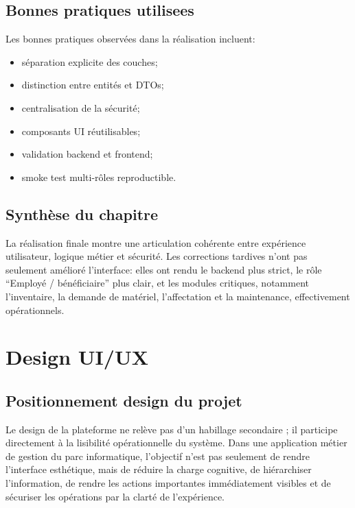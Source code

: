 ﻿\documentclass[12pt,a4paper,oneside]{report}
\begin{document}
\section{Bonnes pratiques utilisees}
Les bonnes pratiques observées dans la réalisation incluent:
\begin{itemize}
  \item séparation explicite des couches;
  \item distinction entre entités et DTOs;
  \item centralisation de la sécurité;
  \item composants UI réutilisables;
  \item validation backend et frontend;
  \item smoke test multi-rôles reproductible.
\end{itemize}

\section{Synthèse du chapitre}
La réalisation finale montre une articulation cohérente entre expérience utilisateur, logique métier et sécurité. Les corrections tardives n'ont pas seulement amélioré l'interface: elles ont rendu le backend plus strict, le rôle \enquote{Employé / bénéficiaire} plus clair, et les modules critiques, notamment l'inventaire, la demande de matériel, l'affectation et la maintenance, effectivement opérationnels.












\chapter{Design UI/UX}
\label{chap:uiux}

\section{Positionnement design du projet}
Le design de la plateforme ne relève pas d'un habillage secondaire ; il participe directement à la lisibilité opérationnelle du système. Dans une application métier de gestion du parc informatique, l'objectif n'est pas seulement de rendre l'interface esthétique, mais de réduire la charge cognitive, de hiérarchiser l'information, de rendre les actions importantes immédiatement visibles et de sécuriser les opérations par la clarté de l'expérience.
\end{document}
